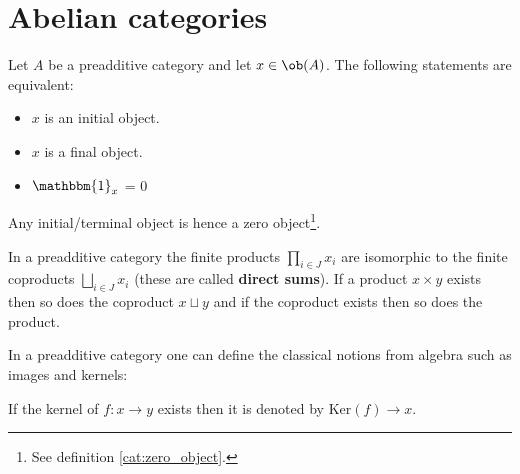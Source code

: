 {\section{Abelian categories}

	
	\begin{property}
		Let $A$ be a preadditive category and let $x\in\ob(A)$. The following statements are equivalent:
		\begin{itemize}
			\item $x$ is an initial object.
			\item $x$ is a final object.
			\item $\mathbbm{1}_x$ = 0
		\end{itemize}
		Any initial/terminal object is hence a zero object\footnote{See definition \ref{cat:zero_object}.}.
	\end{property}
	\begin{property}
		In a preadditive category the finite products $\prod_{i\in J}x_i$ are isomorphic to the finite coproducts $\bigsqcup_{i\in J} x_i$ (these are called \textbf{direct sums}). If a product $x\times y$ exists then so does the coproduct $x\sqcup y$ and if the coproduct exists then so does the product.
	\end{property}
	
	
	In a preadditive category one can define the classical notions from algebra such as images and kernels:
	\begin{notation}[Kernel]
		If the kernel of $f:x\rightarrow y$ exists then it is denoted by Ker$(f)\rightarrow x$.
	\end{notation}
	
}
